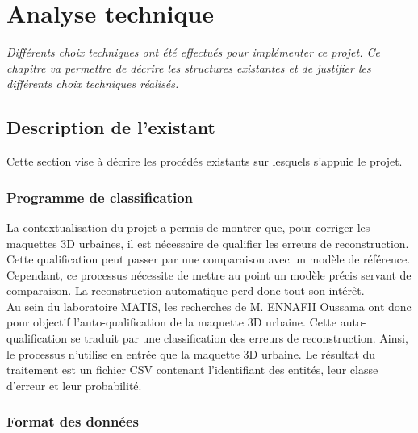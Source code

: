 \chapter[Analyse technique]{Analyse technique}

\textit{Différents choix techniques ont été effectués pour implémenter ce projet. Ce chapitre va permettre de décrire les structures existantes et de justifier les différents choix techniques réalisés.}

\section{Description de l'existant}

Cette section vise à décrire les procédés existants sur lesquels s'appuie le projet.

\subsection{Programme de classification}

La contextualisation du projet a permis de montrer que, pour corriger les maquettes 3D urbaines, il est nécessaire de qualifier les erreurs de reconstruction. Cette qualification peut passer par une comparaison avec un modèle de référence. Cependant, ce processus nécessite de mettre au point un modèle précis servant de comparaison. La reconstruction automatique perd donc tout son intérêt.\\

Au sein du laboratoire MATIS, les recherches de M. ENNAFII Oussama ont donc pour objectif l’auto-qualification de la maquette 3D urbaine. Cette auto-qualification se traduit par une classification des erreurs de reconstruction. Ainsi, le processus n’utilise en entrée que la maquette 3D urbaine. Le résultat du traitement est un fichier CSV contenant l’identifiant des entités, leur classe d’erreur et leur probabilité. 

\subsection{Format des données}

